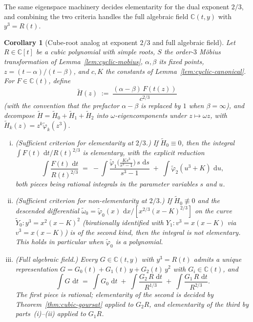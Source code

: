 \documentclass[11pt,a4paper]{article}
\theoremstyle{plain}
\newtheorem{corollary}[theorem]{Corollary}
\theoremstyle{definition}
\theoremstyle{remark}
\newcommand{\C}{\mathbb{C}}
\renewcommand{\d}{\,\mathrm{d}}
\begin{document}
The same eigenspace machinery decides elementarity for the dual exponent $2/3$, and combining the two criteria handles the full algebraic field $\C(t,y)$ with $y^3=R(t)$.

\begin{corollary}[Cube-root analog at exponent $2/3$ and full algebraic field]\label{cor:two-thirds}
Let $R\in\C[t]$ be a cubic polynomial with simple roots, $S$ the order-$3$ M\"obius transformation of Lemma~\ref{lem:cyclic-mobius}, $\alpha,\beta$ its fixed points, $z=(t-\alpha)/(t-\beta)$, and $c, K$ the constants of Lemma~\ref{lem:cyclic-canonical}. For $F\in\C(t)$, define
\begin{equation}\label{eq:Htilde-formula}
  \widetilde H(z) \;:=\; \frac{(\alpha-\beta)\,F(t(z))}{c^{2/3}}
\end{equation}
(with the convention that the prefactor $\alpha-\beta$ is replaced by $1$ when $\beta=\infty$), and decompose $\widetilde H = \widetilde H_0 + \widetilde H_1 + \widetilde H_2$ into $\omega$-eigencomponents under $z\mapsto\omega z$, with $\widetilde H_k(z) = z^k\widetilde\varphi_k(z^3)$.
\begin{enumerate}[(i)]
  \item \emph{(Sufficient criterion for elementarity at $2/3$.)} If $\widetilde H_0\equiv 0$, then the integral $\int F(t)\,\d t/R(t)^{2/3}$ is elementary, with the explicit reduction
  \begin{equation}\label{eq:two-thirds-reduction}
    \int \frac{F(t)\,\d t}{R(t)^{2/3}}
    \;=\; -\!\int \frac{\widetilde\varphi_1\!\bigl(\tfrac{Ks^3}{s^3-1}\bigr)\,s\,\d s}{s^3-1}
    \;+\; \int \widetilde\varphi_2(u^3+K)\,\d u,
  \end{equation}
  both pieces being rational integrals in the parameter variables $s$ and $u$.
  \item \emph{(Sufficient criterion for non-elementarity at $2/3$.)} If $\widetilde H_0\not\equiv 0$ and the descended differential $\widetilde\omega_0 = \widetilde\varphi_0(x)\,\d x/[x^{2/3}(x-K)^{2/3}]$ on the curve $\widetilde Y_0\colon y^3 = x^2(x-K)^2$ (birationally identified with $Y_1\colon v^3 = x(x-K)$ via $v^3 = x(x-K)$) is of the second kind, then the integral is not elementary. This holds in particular when $\widetilde\varphi_0$ is a polynomial.
  \item \emph{(Full algebraic field.)} Every $G\in\C(t,y)$ with $y^3=R(t)$ admits a unique representation $G = G_0(t) + G_1(t)\,y + G_2(t)\,y^2$ with $G_i\in\C(t)$, and
  \begin{equation}\label{eq:cubic-field-split}
    \int G\,\d t \;=\; \int G_0\,\d t \;+\; \int \frac{G_2\,R\,\d t}{R^{1/3}} \;+\; \int \frac{G_1\,R\,\d t}{R^{2/3}}.
  \end{equation}
  The first piece is rational; elementarity of the second is decided by Theorem~\ref{thm:cubic-goursat} applied to $G_2 R$, and elementarity of the third by parts~(i)--(ii) applied to $G_1 R$.
\end{enumerate}
\end{corollary}
\end{document}
